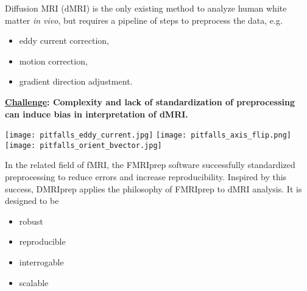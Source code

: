 \documentclass[a0paper,portrait,fontscale=0.395]{baposter}
\newenvironment{Figure}
  {\par\medskip\noindent\minipage{\linewidth}}
  {\endminipage\par\medskip}
\begin{document}
\begin{poster}
{\noindent Diffusion MRI (dMRI) is the only existing method to analyze human white matter \emph{in vivo}, but requires a pipeline of steps to preprocess the data, e.g.
\begin{itemize}[noitemsep]
    \item eddy current correction,
    \item motion correction,
    \item gradient direction adjustment.
\end{itemize}
\textbf{\underline{Challenge}: Complexity and lack of standardization of preprocessing can induce bias in interpretation of dMRI.}
\begin{Figure}
    \centering
    \texttt{[image: pitfalls\_eddy\_current.jpg]}
    \texttt{[image: pitfalls\_axis\_flip.png]}
    \texttt{[image: pitfalls\_orient\_bvector.jpg]}
\end{Figure}

\noindent In the related field of fMRI, the FMRIprep software\cite{esteban2019fmriprep} successfully standardized preprocessing to reduce errors and increase reproducibility. Inspired by this success, DMRIprep applies the philosophy of FMRIprep to dMRI analysis. It is designed to be
\vspace{-0.5em}
\begin{multicols}{2}
\begin{itemize}[nosep]
    \item robust
    \item reproducible
    \item interrogable
    \item scalable
\end{itemize}
\end{multicols}
}


\end{poster}
\end{document}
